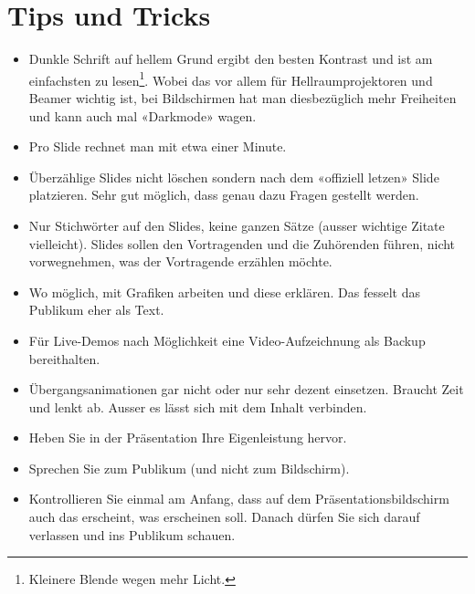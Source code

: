 \section{Tips und Tricks}
\begin{itemize}
	\item Dunkle Schrift auf hellem Grund ergibt den besten Kontrast und ist am
		einfachsten zu lesen\footnote{Kleinere Blende wegen mehr Licht.}. Wobei
		das vor allem für Hellraumprojektoren und Beamer wichtig ist, bei
		Bildschirmen hat man diesbezüglich mehr Freiheiten und kann auch mal
		«Darkmode» wagen.
	\item Pro Slide rechnet man mit etwa einer Minute.
	\item Überzählige Slides nicht löschen sondern nach dem «offiziell letzen»
		Slide platzieren. Sehr gut möglich, dass genau dazu Fragen gestellt
		werden.
	\item Nur Stichwörter auf den Slides, keine ganzen Sätze (ausser wichtige
		Zitate vielleicht). Slides sollen den Vortragenden und die Zuhörenden
		führen, nicht vorwegnehmen, was der Vortragende erzählen möchte.
	\item Wo möglich, mit Grafiken arbeiten und diese erklären. Das
		fesselt das Publikum eher als Text.
	\item Für Live-Demos nach Möglichkeit eine Video-Aufzeichnung als Backup
		bereithalten.
	\item Übergangsanimationen gar nicht oder nur sehr dezent einsetzen. Braucht
		Zeit und lenkt ab. Ausser es lässt sich mit dem Inhalt verbinden.
	\item Heben Sie in der Präsentation Ihre Eigenleistung hervor. 
	\item Sprechen Sie zum Publikum (und nicht zum Bildschirm).
	\item Kontrollieren Sie einmal am Anfang, dass auf dem
		Präsentationsbildschirm auch das erscheint, was erscheinen soll. Danach
		dürfen Sie sich darauf verlassen und ins Publikum schauen.
\end{itemize}


